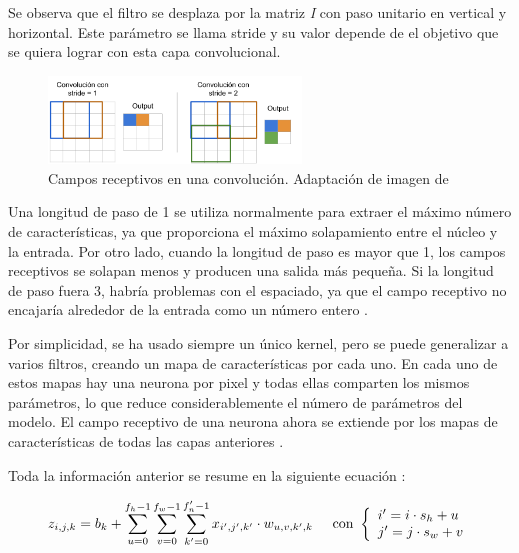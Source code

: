 Se observa que el filtro se desplaza por la matriz \textit{I} con paso unitario en vertical y horizontal. Este parámetro se llama stride y su valor depende de el objetivo que se quiera lograr con esta capa convolucional.

\begin{figure}[h]
    \centering
    \includegraphics[width=0.6\textwidth]{img/stride.png}
    \caption{Campos receptivos en una convolución. Adaptación de imagen de \citep{yepez2020stride}}
    \label{fig:receptive_field}
\end{figure}

Una longitud de paso de 1 se utiliza normalmente para extraer el máximo número de características, ya que proporciona el máximo solapamiento entre el núcleo y la entrada. Por otro lado, cuando la longitud de paso es mayor que 1, los campos receptivos se solapan menos y producen una salida más pequeña. Si la longitud de paso fuera 3, habría problemas con el espaciado, ya que el campo receptivo no encajaría alrededor de la entrada como un número entero \citep{yepez2020stride}.



Por simplicidad, se ha usado siempre un único kernel, pero se puede generalizar a varios filtros, creando un mapa de características por cada uno. En cada uno de estos mapas hay una neurona por pixel y todas ellas comparten los mismos parámetros, lo que reduce considerablemente el número de parámetros del modelo. El campo receptivo de una neurona ahora se extiende por los mapas de características de todas las capas anteriores \citep{geron2022hands}.



Toda la información anterior se resume en la siguiente ecuación \citep{pajares2021aprendizaje}:

\begin{equation}
z_{i,j,k} = b_k + \sum_{u=0}^{f_h-1} \sum_{v=0}^{f_w-1} \sum_{k'=0}^{f_n'-1} x_{i',j',k'} \cdot w_{u,v,k',k} \hspace{5mm} \textup{con }
\left\{
\begin{array}{l}
i' = i \cdot s_h + u \\
j' = j \cdot s_w + v
\end{array}
\right.
\end{equation} \label{eq:conv}

